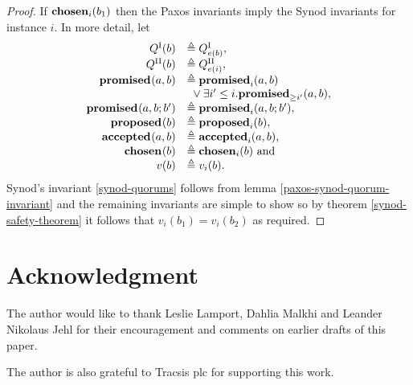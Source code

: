 \documentclass[journal]{IEEEtran}
\begin{document}
\begin{proof} If $\mathbf{chosen}_{i}(b_1)$ then the Paxos invariants imply the Synod
invariants for instance $i$.  In more detail, let
\[\begin{array}{rl}
Q^\textrm{I}(b) &\triangleq {Q}^\textrm{I}_{e(b)}, \\
Q^\textrm{II}(b) &\triangleq {Q}^\textrm{II}_{e(i)}, \\
\mathbf{promised}_{}(a,b) &\triangleq \mathbf{promised}_{i}(a,b) \\
& \ {}\vee \exists i' \le i. \mathbf{promised}_{\ge i'}(a,b), \\
\mathbf{promised}_{}(a,b;b') &\triangleq \mathbf{promised}_{i}(a,b;b'), \\
\mathbf{proposed}_{}(b) &\triangleq \mathbf{proposed}_{i}(b), \\
\mathbf{accepted}_{}(a,b) &\triangleq \mathbf{accepted}_{i}(a,b), \\
\mathbf{chosen}_{}(b) &\triangleq \mathbf{chosen}_{i}(b) \textrm{ and} \\
v(b) &\triangleq v_i(b) .\\
\end{array}
\]
Synod's invariant \ref{synod-quorums} follows from lemma
\ref{paxos-synod-quorum-invariant} and the remaining invariants are simple to
show so by theorem \ref{synod-safety-theorem} it follows that $v_i(b_1) =
v_i(b_2)$ as required.  \end{proof}

\section*{Acknowledgment}

The author would like to thank Leslie Lamport, Dahlia Malkhi and Leander
Nikolaus Jehl for their encouragement and comments on earlier drafts of this
paper.

The author is also grateful to Tracsis plc for supporting this work.



\ifCLASSOPTIONcaptionsoff
  \newpage
\fi




\end{document}
